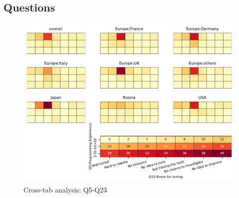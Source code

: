 
\subsection{Questions}


\begin{figure}
\begin{center}
\includegraphics[width=12cm]{../pdfs/Q5-Q23.pdf}
\caption{Cross-tab analysis: Q5-Q23}
\label{fig:Q5-Q23}
\end{center}
\end{figure}
